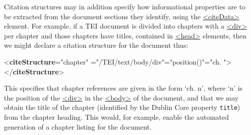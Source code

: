 Citation structures may in addition specify how informational properties are to be extracted from the document sections they identify, using the \hyperref[TEI.citeData]{<citeData>} element. For example, if a TEI document is divided into chapters with a \hyperref[TEI.div]{<div>} per chapter and those chapters have titles, contained in \hyperref[TEI.head]{<head>} elements, then we might declare a citation structure for the document thus: \par\bgroup{}\exampleFont \begin{shaded}\noindent\mbox{}{<\textbf{citeStructure}\hspace*{1em}{unit}="{chapter}"\mbox{}\newline 
\hspace*{1em}{match}="{/TEI/text/body/div}"\hspace*{1em}{use}="{position()}"\hspace*{1em}{delim}="{ch. }">}\mbox{}\newline 
{}\mbox{}\newline 
{</\textbf{citeStructure}>}\end{shaded}\egroup\par \par
This specifies that chapter references are given in the form ‘ch. n’, where ‘n’ is the position of the \hyperref[TEI.div]{<div>} in the \hyperref[TEI.body]{<body>} of the document, and that we may obtain the title of the chapter (identified by the Dublin Core property \texttt{title}) from the chapter heading. This would, for example, enable the automated generation of a chapter listing for the document.
